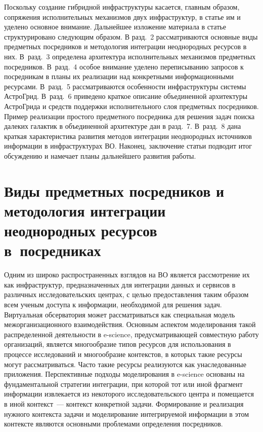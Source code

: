 \begin{multicols}{2}
     Поскольку создание гибридной инфраструктуры касается, главным образом,
сопряжения исполнительных механизмов двух инфраструктур, в \mbox{статье} им и уделено
основное внимание. Дальнейшее изложение материала в статье структурировано
следующим образом. В разд.~2 рассматриваются основные виды предметных
посредников и методология интеграции неоднородных ресурсов в них. В~разд.~3
определена архитектура исполнительных механизмов предметных посредников.
В~разд.~4 особое внимание уделено переписыванию запросов к посредникам в планы их
реализации над конкретными информационными ресурсами. В~разд.~5
рас\-смат\-ри\-ва\-ют\-ся особенности инфраструктуры сис\-те\-мы АстроГрид. В~разд.~6
приведено краткое описание объединенной архитектуры АстроГрида и средств поддержки
исполнительного слоя предметных посредников. Пример реализации простого
предметного посредника для решения задач поиска далеких галактик в объединенной
архитектуре дан в разд.~7. В~разд.~8 дана краткая характеристика развития методов
интеграции неоднородных источников информации в инфраструктурах ВО. Наконец,
заключение статьи подводит итог об\-суж\-де\-нию и намечает планы дальнейшего развития
работы.

\section{Виды предметных посредников и методология интеграции неоднородных
ресурсов в~посредниках}

     Одним из широко распространенных взглядов на ВО
является рассмотрение их как инфраструктур, предназначенных для интеграции данных и
сервисов в различных исследовательских центрах, с целью предоставления таким образом
всем ученым доступа к информации, необходимой для решения задач. Виртуальная
обсерватория может
рас\-смат\-ри\-вать\-ся как специальная модель межорганизационного взаимодействия.
Основным аспектом моделирования такой распределенной дея\-тель\-ности в e-science,
предусматривающей совместную работу организаций, является многообразие типов
ресурсов для использования в процессе исследований и многообразие контекстов, в
которых такие ресурсы могут рассматриваться. Часто такие ресурсы реализуются как
унаследованные приложения. Перспективные подходы моделирования в e-science
основаны на фундаментальной стратегии интеграции, при которой тот или иной фрагмент
информации извлекается из некоторого исследовательского центра и помещается в иной
контекст~--- контекст конкретной задачи. Формирование и реализация нужного контекста
задачи и моделирование интегрируемой информации в этом контексте являются
основными проблемами определения посредников.


\end{multicols}
